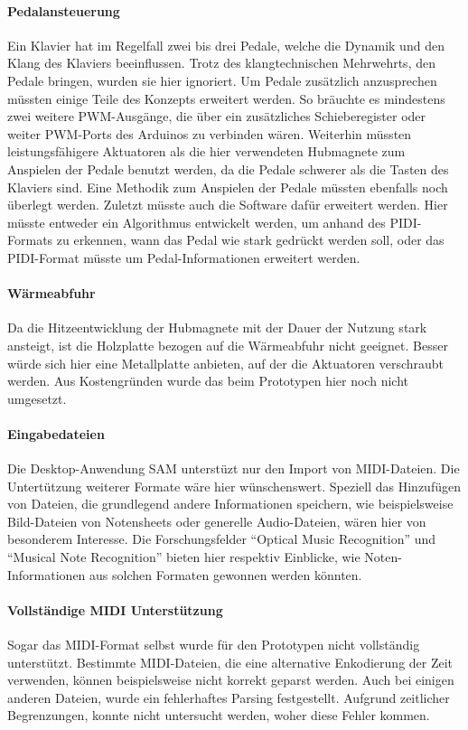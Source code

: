 \paragraph{Pedalansteuerung}
Ein Klavier hat im Regelfall zwei bis drei Pedale, welche die Dynamik und den Klang des Klaviers beeinflussen.
Trotz des klangtechnischen Mehrwehrts, den Pedale bringen, wurden sie hier ignoriert.
Um Pedale zusätzlich anzusprechen müssten einige Teile des Konzepts erweitert werden.
So bräuchte es mindestens zwei weitere \ac{PWM}-Ausgänge, die über ein zusätzliches Schieberegister oder weiter \ac{PWM}-Ports des Arduinos zu verbinden wären.
Weiterhin müssten leistungsfähigere Aktuatoren als die hier verwendeten Hubmagnete zum Anspielen der Pedale benutzt werden, da die Pedale schwerer als die Tasten des Klaviers sind.
Eine Methodik zum Anspielen der Pedale müssten ebenfalls noch überlegt werden.
Zuletzt müsste auch die Software dafür erweitert werden.
Hier müsste entweder ein Algorithmus entwickelt werden, um anhand des \ac{PIDI}-Formats zu erkennen, wann das Pedal wie stark gedrückt werden soll, oder das \ac{PIDI}-Format müsste um Pedal-Informationen erweitert werden.

\paragraph{Wärmeabfuhr}
Da die Hitzeentwicklung der Hubmagnete mit der Dauer der Nutzung stark ansteigt, ist die Holzplatte bezogen auf die Wärmeabfuhr nicht geeignet.
Besser würde sich hier eine Metallplatte anbieten, auf der die Aktuatoren verschraubt werden.
Aus Kostengründen wurde das beim Prototypen hier noch nicht umgesetzt.

\paragraph{Eingabedateien}
Die Desktop-Anwendung \ac{SAM} unterstüzt nur den Import von \ac{MIDI}-Dateien.
Die Untertützung weiterer Formate wäre hier wünschenswert.
Speziell das Hinzufügen von Dateien, die grundlegend andere Informationen speichern, wie beispielsweise Bild-Dateien von Notensheets oder generelle Audio-Dateien, wären hier von besonderem Interesse.
Die Forschungsfelder \enquote{Optical Music Recognition} und \enquote{Musical Note Recognition} bieten hier respektiv Einblicke, wie Noten-Informationen aus solchen Formaten gewonnen werden könnten.

\paragraph{Vollständige \ac{MIDI} Unterstützung}
Sogar das \ac{MIDI}-Format selbst wurde für den Prototypen nicht vollständig unterstützt.
Bestimmte \ac{MIDI}-Dateien, die eine alternative Enkodierung der Zeit verwenden, können beispielsweise nicht korrekt geparst werden.
Auch bei einigen anderen Dateien, wurde ein fehlerhaftes Parsing festgestellt.
Aufgrund zeitlicher Begrenzungen, konnte nicht untersucht werden, woher diese Fehler kommen.

